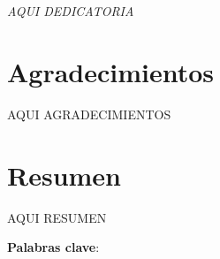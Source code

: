 

\cleardoublepage %
\chapter*{}
\setlength{\leftmargin}{0.5\textwidth}
\setlength{\parsep}{0cm}
\addtolength{\topsep}{0.5cm}
\begin{flushright}
	\small\em{
		AQUI DEDICATORIA
	}
\end{flushright}




\chapter*{Agradecimientos}

\thispagestyle{empty}
\vspace{1cm}

AQUI AGRADECIMIENTOS

\cleardoublepage %



\chapter{Resumen}
\thispagestyle{empty}
AQUI RESUMEN

\vspace{1cm}

\textbf{Palabras clave}: 

\cleardoublepage %



